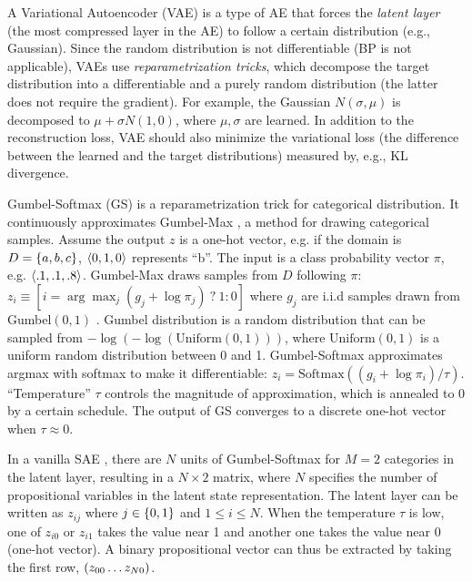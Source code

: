 A Variational Autoencoder (VAE) \cite{kingma2013auto} is a type of AE that forces the \emph{latent layer} (the most compressed layer in the AE) to follow a certain distribution (e.g., Gaussian).
Since the random distribution is not differentiable (BP is not applicable), VAEs use \emph{reparametrization tricks}, which decompose the target distribution into a differentiable and a purely random distribution (the latter does not require the gradient).
For example, the Gaussian $N(\sigma,\mu)$ is decomposed to $\mu+\sigma N(1,0)$, where $\mu,\sigma$ are learned.
In addition to the reconstruction loss, VAE should also minimize the variational loss (the difference between the learned and the target distributions) measured by, e.g.,  KL divergence.

Gumbel-Softmax (GS) is a re\-para\-metri\-zation trick \cite{jang2016categorical} for categorical distribution.
It continuously approximates Gumbel-Max \cite{maddison2014sampling}, a method for drawing categorical samples.
Assume the output $z$ is a one-hot vector, e.g. if the domain is $D={\left\{a,b,c\right\}}$, ${\left<0,1,0\right>}$ represents ``b''.
The input is a class probability vector $\pi$, e.g. ${\left<.1,.1,.8\right>}$.
Gumbel-Max draws samples from $D$ following $\pi$:
 $z_i \equiv [ i = \arg \max_j (g_j+\log \pi_j)\ ?\ 1 : 0 ]$
where $g_j$ are i.i.d samples drawn from Gumbel$(0,1)$ \cite{gumbel1954statistical}.
Gumbel distribution is a random distribution that can be sampled from $-\log (-\log (\text{Uniform}(0,1)))$, where
$\text{Uniform}(0,1)$ is a uniform random distribution between 0 and 1.
Gumbel-Softmax approximates argmax with softmax to make it differentiable:
$z_i = \text{Softmax}((g_i+\log \pi_i)/\tau)$.
``Temperature'' $\tau$ controls the magnitude of approximation, which is annealed to 0 by a certain schedule.
The output of GS converges to a discrete one-hot vector when $\tau\approx 0$.

In a vanilla SAE \cite{Asai2018}, there are $N$ units of Gumbel-Softmax
for $M=2$ categories in the latent layer, resulting in a $N\times 2$ matrix,
where $N$ specifies the number of propositional variables in the latent
state representation. The latent layer can be written as
$z_{ij}$ where $j\in {\left\{0,1\right\}}$ and $1\leq i \leq N$.  When the
temperature $\tau$ is low, one of $z_{i0}$ or $z_{i1}$ takes the value
near 1 and another one takes the value near 0 (one-hot vector).  A binary
propositional vector can thus be extracted by taking the first row,
${\left(z_{00}\ldots z_{N0}\right)}$.

